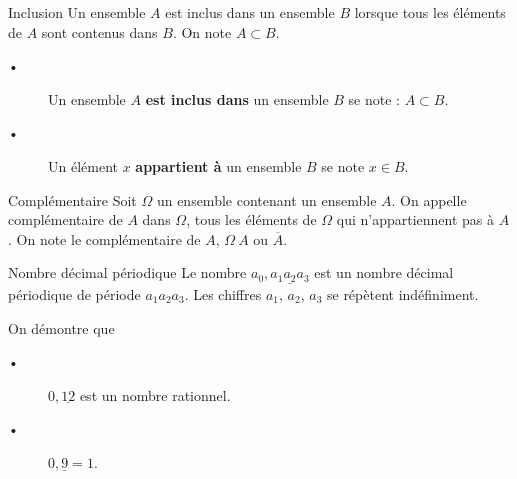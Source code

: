  
 
 
 
 
 

\begin{DefT}{Inclusion}
Un ensemble $A$ est inclus dans un ensemble $B$ lorsque tous les éléments de $A$ sont contenus dans $B$. On note $A \subset B$.
\end{DefT}


\begin{Rq}
\begin{description}
\item[•] Un ensemble  $A$ \textbf{est inclus dans} un ensemble $B$  se note : $A \subset B$.
\item[•] Un élément $x$ \textbf{appartient à} un ensemble $B$ se note  $x \in B$.
\end{description}
\end{Rq}

 

\begin{DefT}{Complémentaire}
Soit $\Omega$ un ensemble contenant un ensemble $A$. On appelle complémentaire de $A$ dans $\Omega$, tous les éléments de $\Omega$ qui n'appartiennent pas à $A$. On note le complémentaire de $A$, $\Omega \ A$ ou $\overline{A}$.
\end{DefT}



 

  
  






  
\begin{Approfondissement}


\begin{DefT}{Nombre décimal périodique}
Le nombre $a_0,\underline{a_1a_2a_3}$ est un nombre décimal périodique de période $a_1a_2a_3$. Les chiffres $a_1$, $a_2$, $a_3$ se répètent indéfiniment.
\end{DefT}


On démontre que 
\begin{description}
\item[•] $0,\underline{12}$ est un nombre rationnel.
\item[•] $0,\underline{9}=1$.
\end{description}


\end{Approfondissement}



